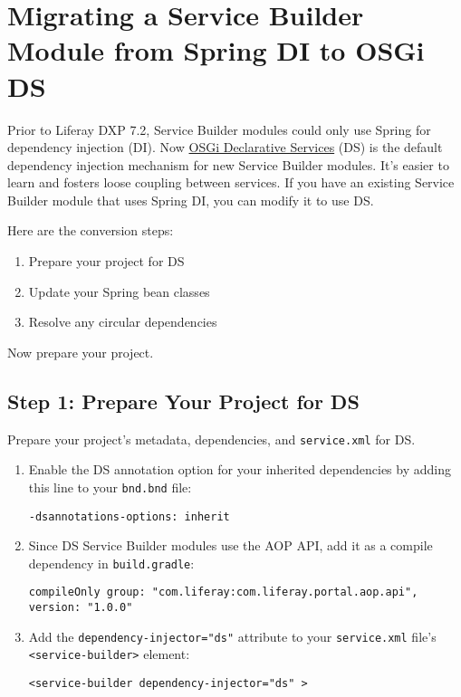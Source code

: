 \chapter{Migrating a Service Builder Module from Spring DI to OSGi
DS}\label{migrating-a-service-builder-module-from-spring-di-to-osgi-ds}

Prior to Liferay DXP 7.2, Service Builder modules could only use Spring
for dependency injection (DI). Now
\href{/docs/7-2/frameworks/-/knowledge_base/f/declarative-services}{OSGi
Declarative Services} (DS) is the default dependency injection mechanism
for new Service Builder modules. It's easier to learn and fosters loose
coupling between services. If you have an existing Service Builder
module that uses Spring DI, you can modify it to use DS.

Here are the conversion steps:

\begin{enumerate}
\def\labelenumi{\arabic{enumi}.}
\item
  Prepare your project for DS
\item
  Update your Spring bean classes
\item
  Resolve any circular dependencies
\end{enumerate}

Now prepare your project.

\section{Step 1: Prepare Your Project for
DS}\label{step-1-prepare-your-project-for-ds}

Prepare your project's metadata, dependencies, and \texttt{service.xml}
for DS.

\begin{enumerate}
\def\labelenumi{\arabic{enumi}.}
\item
  Enable the DS annotation option for your inherited dependencies by
  adding this line to your \texttt{bnd.bnd} file:

\begin{verbatim}
-dsannotations-options: inherit
\end{verbatim}
\item
  Since DS Service Builder modules use the AOP API, add it as a compile
  dependency in \texttt{build.gradle}:

\begin{verbatim}
compileOnly group: "com.liferay:com.liferay.portal.aop.api", version: "1.0.0"
\end{verbatim}
\item
  Add the \texttt{dependency-injector="ds"} attribute to your
  \texttt{service.xml} file's
  \texttt{\textless{}service-builder\textgreater{}} element:

\begin{verbatim}
<service-builder dependency-injector="ds" >
\end{verbatim}
\end{enumerate}

